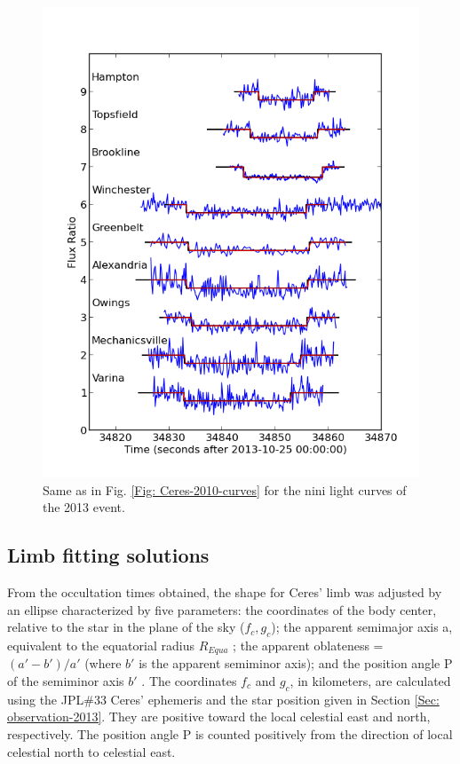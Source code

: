\documentclass[useAMS,usenatbib]{mn2e}
\begin{document}
\begin{figure}
\includegraphics[scale=0.58]{figures/Ceres_2013_fluxratio} 
\caption{Same as in Fig. \ref{Fig: Ceres-2010-curves} for the nini light curves of the 2013 event. \label{Fig: Ceres-2013-curves}}
\end{figure}

\subsection{Limb fitting solutions}

From the occultation times obtained, the shape for Ceres' limb was adjusted by an ellipse characterized by five parameters: the coordinates of the body center, relative to the star in the plane of the sky ($f_{c}, g_{c}$); the apparent semimajor axis a, equivalent to the equatorial radius $R_{Equa}$ ; the apparent oblateness = $(a'-b')/a'$ (where $b'$ is the apparent semiminor axis); and the position angle P of the semiminor axis $b'$ . The coordinates $f_{c}$ and $g_{c}$, in kilometers, are calculated using the JPL\#33  Ceres' ephemeris and the star position given in Section \ref{Sec: observation-2013}. They are positive toward the local celestial east and north, respectively.  The position angle P is counted positively from the direction of local celestial north to celestial east.
\end{document}
